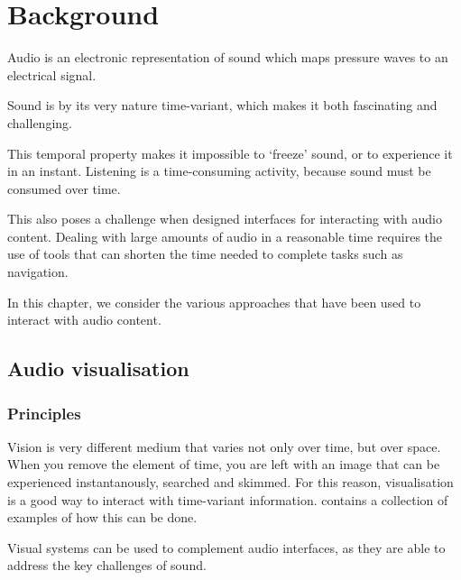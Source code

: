 \chapter{Background}\label{chp:background}

Audio is an electronic representation of sound which maps pressure waves to an electrical signal.

Sound is by its very nature time-variant, which makes it both fascinating and challenging.

This temporal property makes it impossible to `freeze' sound, or to experience it in an instant. Listening is a
time-consuming activity, because sound must be consumed over time.



This also poses a challenge when designed interfaces for interacting with audio content. Dealing with large amounts of
audio in a reasonable time requires the use of tools that can shorten the time needed to complete tasks such as
navigation.

In this chapter, we consider the various approaches that have been used to interact with audio content.

\section{Audio visualisation}

\subsection{Principles}

Vision is very different medium that varies not only over time, but over space. When you remove the element of time,
you are left with an image that can be experienced instantanously, searched and skimmed. For this reason, visualisation
is a good way to interact with time-variant information. \citet{Aigner2011} contains a collection of examples of how
this can be done.

Visual systems can be used to complement audio interfaces, as they are able to address the key challenges of sound.


